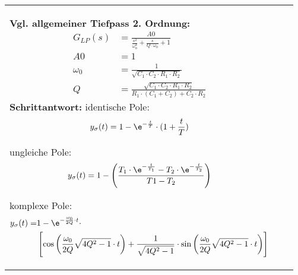 \begin{longtable}{|>{\bfseries}p{3cm}|c|p{10cm}|}
{       \textbf{Vgl. allgemeiner Tiefpass 2. Ordnung:}\newline
       \begin{align*}
           G_{LP}(s)	&= \frac{A0}{\frac{s^2}{\omega_{0}^2}+\frac{s}{Q\cdot\omega_{0}}+1} \\
           A0	 		&= 1 \\
           \omega_{0}	&= \frac{1}{\sqrt{C_1\cdot C_2\cdot R_1\cdot R_2}}\\
           Q 	        &=\frac{\sqrt{C_1\cdot C_2\cdot R_1\cdot R_2}}{R_1\cdot (C_1+C_2)+C_2 \cdot R_2}
        \end{align*}\newline
        \textbf{Schrittantwort:} \newline
        identische Pole: \newline
        \[y_{\sigma}(t) = 1-\e^{-\frac{t}{T}}\cdot(1+\frac{t}{T})\] \newline
          
        ungleiche Pole: \newline
        \[y_{\sigma}(t) = 1-\left(\frac{T_1 \cdot \e^{-\frac{t}{T_1}}- T_2 \cdot
        \e^{-\frac{t}{T_2}}}{T1-T_2}\right) \] \newline
          
        komplexe Pole: \newline
        \begin{align*}
          y_{\sigma}(t) = &1-\e^{-\frac{\omega_0}{2Q}\cdot t}\cdot \\
          &\left[\cos \left(\frac{\omega_0}{2Q} \sqrt{4Q^2-1} \cdot t \right) +
          \frac{1}{\sqrt{4Q^2-1}}\cdot \sin\left(\frac{\omega_0}{2Q} \sqrt{4Q^2-1} \cdot t \right)\right]
        \end{align*} \newline
        
}
\end{longtable}

